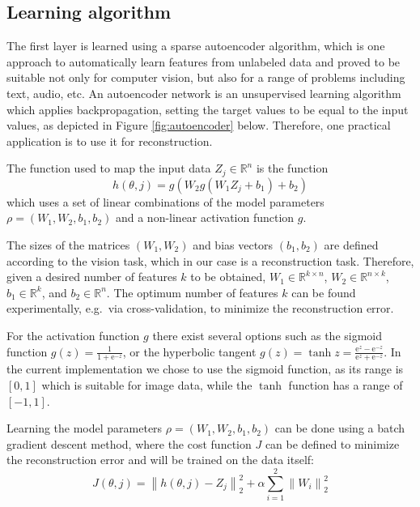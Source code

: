 \documentclass[runningheads]{llncs}
\begin{document}
\subsection{Learning algorithm} 

The first layer is learned using a sparse autoencoder algorithm, which is one approach to automatically learn features from unlabeled data and proved to be suitable not only for computer vision, but also for a range of problems including text, audio, etc. An autoencoder network is an unsupervised learning algorithm which applies backpropagation, setting the target values to be equal to the input values, as depicted in Figure \ref{fig:autoencoder} below. Therefore, one practical application is to use it for reconstruction. 


The function used to map the input data $Z_j\in \mathbb{R}^n$ is the function
\begin{equation}
 h(\theta,j)= g(W_2 g(W_1 Z_j+b_1)+b_2)
\end{equation}
which uses a set of linear combinations of the model parameters 
$\rho=(W_1,W_2,b_1,b_2)$ and a non-linear activation function $g$.

The sizes of the matrices $(W_1,W_2)$ and bias vectors $(b_1,b_2)$ are defined according to the vision task, which in our case is a reconstruction task. Therefore, given a desired number of features $k$ to be obtained, $W_1 \in \mathbb{R}^{k\times n} $, $W_2 \in \mathbb{R}^{n\times k}$, $b_1\in \mathbb{R}^k$, and $b_2 \in \mathbb{R}^n$. The optimum number of features $k$ can be found experimentally, e.g.\ via cross-validation, to minimize the reconstruction error.

For the activation function $g$ there exist several options such as the sigmoid function $g(z)=\frac{1}{1+\text{e}^{-z}}$, or the hyperbolic tangent $  g(z)=\tanh z=\frac{\text{e}^z-\text{e}^{-z}}{\text{e}^z+\text{e}^{-z}}$.
In the current implementation we chose to use the sigmoid function, as its range is $[0,1]$ which is suitable for image data, while the $\tanh$ function has a range of $[-1,1]$.

Learning the model parameters $\rho=(W_1,W_2,b_1,b_2)$ can be done using a batch gradient descent method, where the cost function $J$ can be defined to minimize the reconstruction error and will be trained on the data itself:
\begin{equation}
   J(\theta,j)=\left\|h(\theta,j)-Z_j\right\|_2^2 + \alpha\sum_{i=1}^{2} \left\|W_i\right\|_2^2
\end{equation}
\end{document}
